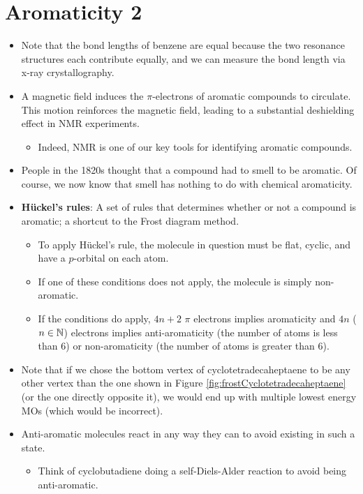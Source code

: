 \documentclass[../notes.tex]{subfiles}
\begin{document}
\section{Aromaticity 2}
\begin{itemize}
    \item {}Note that the bond lengths of benzene are equal because the two resonance structures each contribute equally, and we can measure the bond length via x-ray crystallography.
    \item A magnetic field induces the $\pi$-electrons of aromatic compounds to circulate. This motion reinforces the magnetic field, leading to a substantial deshielding effect in NMR experiments.
    \begin{itemize}
        \item Indeed, NMR is one of our key tools for identifying aromatic compounds.
    \end{itemize}
    \item People in the 1820s thought that a compound had to smell to be aromatic. Of course, we now know that smell has nothing to do with chemical aromaticity.
    \item \textbf{H\"{u}ckel's rules}: A set of rules that determines whether or not a compound is aromatic; a shortcut to the Frost diagram method.
    \begin{itemize}
        \item To apply H\"{u}ckel's rule, the molecule in question must be flat, cyclic, and have a $p$-orbital on each atom.
        \item If one of these conditions does not apply, the molecule is simply non-aromatic.
        \item If the conditions do apply, $4n+2$ $\pi$ electrons implies aromaticity and $4n$ ($n\in\mathbb{N}$) electrons implies anti-aromaticity (the number of atoms is less than 6) or non-aromaticity (the number of atoms is greater than 6).
    \end{itemize}
    \item Note that if we chose the bottom vertex of cyclotetradecaheptaene to be any other vertex than the one shown in Figure \ref{fig:frostCyclotetradecaheptaene} (or the one directly opposite it), we would end up with multiple lowest energy MOs (which would be incorrect).
    \item Anti-aromatic molecules react in any way they can to avoid existing in such a state.
    \begin{itemize}
        \item Think of cyclobutadiene doing a self-Diels-Alder reaction to avoid being anti-aromatic.

\end{itemize}
\end{itemize}
\end{document}
